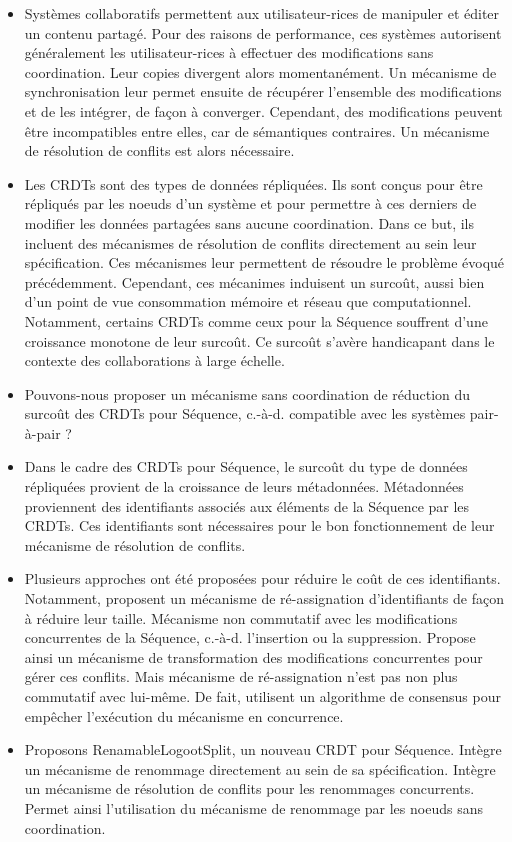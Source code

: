 \documentclass[12pt]{thesul}
\theoremstyle{definition}
\newcommand{\ie}{c.-à-d.\xspace}
\begin{document}
\begin{itemize}
  \item Systèmes collaboratifs permettent aux utilisateur-rices de manipuler et éditer un contenu partagé.
    Pour des raisons de performance, ces systèmes autorisent généralement les utilisateur-rices à effectuer des modifications sans coordination.
    Leur copies divergent alors momentanément.
    Un mécanisme de synchronisation leur permet ensuite de récupérer l'ensemble des modifications et de les intégrer, de façon à converger.
    Cependant, des modifications peuvent être incompatibles entre elles, car de sémantiques contraires.
    Un mécanisme de résolution de conflits est alors nécessaire.
  \item Les \acp{CRDT} sont des types de données répliquées.
    Ils sont conçus pour être répliqués par les noeuds d'un système et pour permettre à ces derniers de modifier les données partagées sans aucune coordination.
    Dans ce but, ils incluent des mécanismes de résolution de conflits directement au sein leur spécification.
    Ces mécanismes leur permettent de résoudre le problème évoqué précédemment.
    Cependant, ces mécanimes induisent un surcoût, aussi bien d'un point de vue consommation mémoire et réseau que computationnel.
    Notamment, certains \acp{CRDT} comme ceux pour la Séquence souffrent d'une croissance monotone de leur surcoût.
    Ce surcoût s'avère handicapant dans le contexte des collaborations à large échelle.
  \item Pouvons-nous proposer un mécanisme sans coordination de réduction du surcoût des \acp{CRDT} pour Séquence, \ie compatible avec les systèmes pair-à-pair ?
  \item Dans le cadre des \acp{CRDT} pour Séquence, le surcoût du type de données répliquées provient de la croissance de leurs métadonnées.
    Métadonnées proviennent des identifiants associés aux éléments de la Séquence par les \acp{CRDT}.
    Ces identifiants sont nécessaires pour le bon fonctionnement de leur mécanisme de résolution de conflits.
  \item Plusieurs approches ont été proposées pour réduire le coût de ces identifiants.
    Notamment, \cite{letia:hal-01248270,zawirski:hal-01248197} proposent un mécanisme de ré-assignation d'identifiants de façon à réduire leur taille.
    Mécanisme non commutatif avec les modifications concurrentes de la Séquence, \ie l'insertion ou la suppression.
    Propose ainsi un mécanisme de transformation des modifications concurrentes pour gérer ces conflits.
    Mais mécanisme de ré-assignation n'est pas non plus commutatif avec lui-même.
    De fait, utilisent un algorithme de consensus pour empêcher l'exécution du mécanisme en concurrence.
  \item Proposons RenamableLogootSplit, un nouveau \ac{CRDT} pour Séquence.
    Intègre un mécanisme de renommage directement au sein de sa spécification.
    Intègre un mécanisme de résolution de conflits pour les renommages concurrents.
    Permet ainsi l'utilisation du mécanisme de renommage par les noeuds sans coordination.
\end{itemize}
\end{document}
